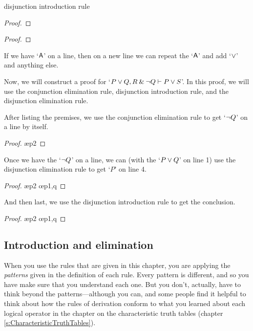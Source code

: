 \begin{factboxy}{disjunction introduction rule}\label{di-rule-box}
\begin{proof}
\end{proof}

\begin{proof}
\end{proof}

\small{If we have `$\mathsf{A}$' on a line, then on a new line we can repeat the `$\mathsf{A}$' and add `$\vee$' and anything else.}

\end{factboxy}
\bigskip

\noindent Now, we will construct a proof for `$P \vee Q, R \mathbin{\&} {\neg} Q \vdash P \vee S$'. In this proof, we will use the conjunction elimination rule, disjunction introduction rule, and the disjunction elimination rule.

After listing the premises, we use the conjunction elimination rule to get `${\neg} Q$' on a line by itself. 
\begin{proof}
	 \pr{}
	 \pr{}
	 \ae{p2}
\end{proof}
Once we have the `${\neg} Q$' on a line, we can (with the `$P \vee Q$' on line 1) use the disjunction elimination rule to get `$P$' on line 4.
\begin{proof}
	 \pr{}
	 \pr{}
	 \ae{p2}
	 \oe{p1,q}
\end{proof}
And then last, we use the disjunction introduction rule to get the conclusion.
\begin{proof}
	 \pr{}
	 \pr{}
	 \ae{p2}
	 \oe{p1,q}
	 
\end{proof}



\subsection{Introduction and elimination}
When you use the rules that are given in this chapter, you are applying the \textit{patterns} given in the definition of each rule. Every pattern is different, and so you have make sure that you understand each one. But you don't, actually, have to think beyond the patterns---although you can, and some people find it helpful to think about how the rules of derivation conform to what you learned about each logical operator in the chapter on the characteristic truth tables (chapter \ref{s:CharacteristicTruthTables}).

